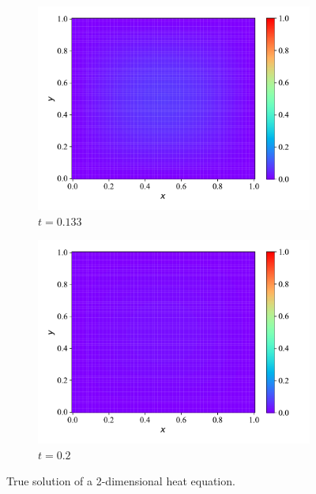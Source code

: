 \begin{figure}[H]
     \begin{subfigure}[b]{0.45\textwidth}
         \centering
         \includegraphics[width=\textwidth]{Figures/InitialExperiments/heat2d_3_true.pdf}
         \caption{$t = 0.133$}
         \label{fig:heat2d_3_true}
     \end{subfigure}
     \hfill
     \begin{subfigure}[b]{0.45\textwidth}
         \centering
         \includegraphics[width=\textwidth]{Figures/InitialExperiments/heat2d_4_true.pdf}
         \caption{$t = 0.2$}
         \label{fig:heat2d_4_true}
     \end{subfigure}
    \caption{True solution of a 2-dimensional heat equation.}
    \label{fig:heat2d_true}
\end{figure}

